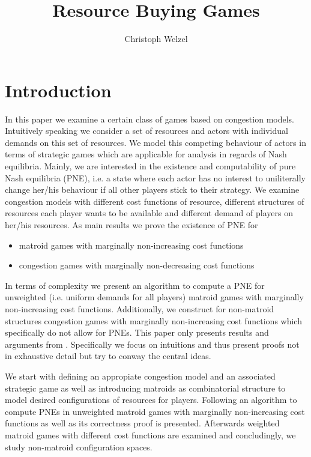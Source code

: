 \documentclass{scrartcl}
\title{Resource Buying Games}
\author{Christoph Welzel}
\theoremstyle{nonumberplain}
\begin{document}

\maketitle
\section{Introduction}
In this paper we examine a certain class of games based on congestion models.
Intuitively speaking we consider a set of resources and actors with individual
demands on this set of resources. We model this competing behaviour of actors
in terms of strategic games which are applicable for analysis in regards of
Nash equilibria. Mainly, we are interested in the existence and computability
of pure Nash equilibria (PNE), i.e. a state where each actor has no interest
to uniliterally change her/his behaviour if all other players stick to their
strategy. We examine congestion models with different cost functions of
resource, different structures of resources each player wants to be available
and different demand of players on her/his resources. As main results we prove
the existence of PNE for
\begin{itemize}
  \item matroid games with marginally non-increasing cost functions
  \item congestion games with marginally non-decreasing cost functions
\end{itemize}
In terms of complexity we present an algorithm to compute a PNE for unweighted
(i.e. uniform demands for all players) matroid games with marginally
non-increasing cost functions. Additionally, we construct for non-matroid
structures congestion games with marginally non-increasing cost functions which
specifically do not allow for PNEs. This paper only presents results and
arguments from \cite{main}. Specifically we focus on intuitions and thus
present proofs not in exhaustive detail but try to conway the central ideas.

We start with defining an appropiate congestion model and an associated
strategic game as well as introducing matroids as combinatorial structure
to model desired configurations of resources for players. Following an
algorithm to compute PNEs in unweighted matroid games with marginally
non-increasing cost functions as well as its correctness proof is presented.
Afterwards weighted matroid games with different cost functions are examined
and concludingly, we study non-matroid configuration spaces.
\end{document}
